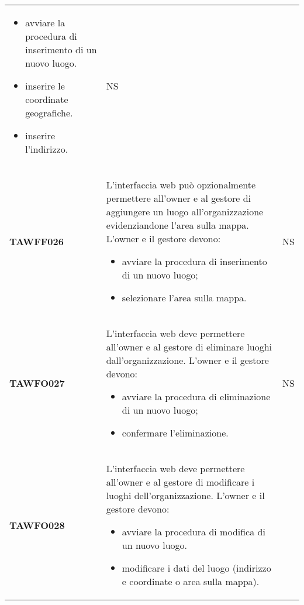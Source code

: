 \documentclass[../piano-di-qualifica.tex]{subfiles}
\begin{document}
\begin{centering}
\begin{longtable}[H]{>{\centering\bfseries}m{3cm} >{}p{10cm} >{\centering\arraybackslash}m{3cm}}
                          \begin{itemize}
                            \item avviare la procedura di inserimento di un nuovo luogo.
                            \item inserire le coordinate geografiche.
                            \item inserire l'indirizzo.
                          \end{itemize}
                      & NS \\
        TAWFF026      & L'interfaccia web può opzionalmente permettere all'owner e al gestore di aggiungere un luogo all'organizzazione evidenziandone l'area sulla mappa. \newline
                        L'owner e il gestore devono:
                          \begin{itemize}
                            \item avviare la procedura di inserimento di un nuovo luogo;
                            \item selezionare l'area sulla mappa.
                          \end{itemize}
                      & NS \\
        TAWFO027      & L'interfaccia web deve permettere all'owner e al gestore di eliminare luoghi dall'organizzazione. \newline
                        L'owner e il gestore devono:
                          \begin{itemize}
                            \item avviare la procedura di eliminazione di un nuovo luogo;
                            \item confermare l'eliminazione.
                          \end{itemize}
                      & NS \\
        TAWFO028      & L'interfaccia web deve permettere all'owner e al gestore di modificare i luoghi dell'organizzazione. \newline
                        L'owner e il gestore devono:
                          \begin{itemize}
                            \item avviare la procedura di modifica di un nuovo luogo.
                            \item modificare i dati del luogo (indirizzo e coordinate o area sulla mappa).
                          \end{itemize}

\end{longtable}
\end{centering}
\end{document}
